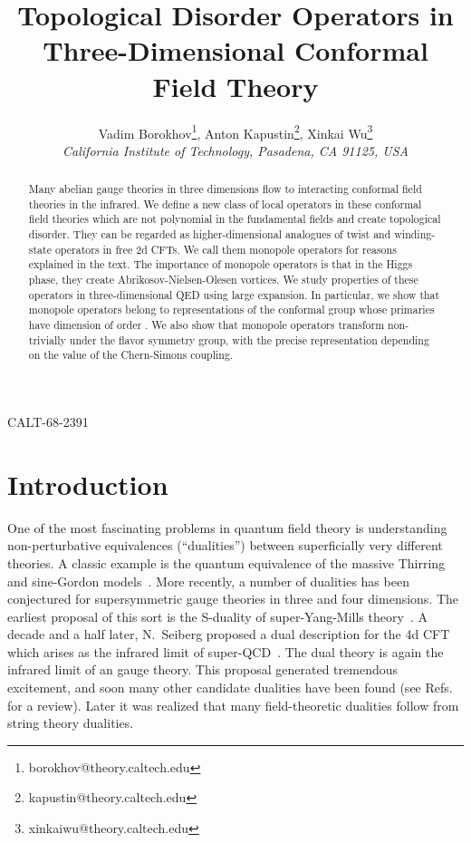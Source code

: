 \documentclass[a4paper,12pt, amsfonts, amssymb]{article}
\title{\bf \large Topological Disorder Operators in Three-Dimensional
Conformal Field Theory}
\author{Vadim Borokhov\thanks{borokhov@theory.caltech.edu}, Anton Kapustin\thanks{kapustin@theory.caltech.edu}, Xinkai Wu\thanks{xinkaiwu@theory.caltech.edu}\\
\it California Institute of Technology, Pasadena, CA 91125, USA
}
\begin{document}
\begin{titlepage}

\renewcommand{\thepage}{ }

\maketitle

\begin{abstract}

Many abelian gauge theories in three dimensions flow to interacting
conformal field theories in the infrared. We define a new class
of local operators in these conformal field theories which are not
polynomial in the fundamental fields and create
topological disorder. They can be regarded as higher-dimensional
analogues of twist and winding-state operators in free 2d CFTs. 
We call them monopole 
operators for reasons explained in the
text. The importance of monopole operators is that in the Higgs phase, 
they create Abrikosov-Nielsen-Olesen vortices. 
We study properties of these operators in three-dimensional QED using 
large \coordHE{} expansion. In particular, we show that monopole operators
belong to representations of the conformal group whose primaries have
dimension of order \coordHE{}. We also show that monopole operators transform
non-trivially under the flavor symmetry group, with the precise representation
depending on the value of the Chern-Simons coupling.

\end{abstract}

\vspace{-6.5in}

\parbox{\linewidth}
{\small\hfill CALT-68-2391}

\end{titlepage}


\section{Introduction}

One of the most fascinating problems in quantum field theory is understanding
non-perturbative equivalences (``dualities'') between superficially
very different theories. A classic example is the quantum equivalence of the massive Thirring and sine-Gordon models~\cite{Coleman,Mandelstam}.
More recently, a number of dualities has been conjectured for supersymmetric
gauge theories in three and four dimensions. The earliest proposal of
this sort is the S-duality of \coordHE{}  \coordHE{} super-Yang-Mills 
theory~\cite{MO,WO,Osborn}.
A decade and a half later, N.~Seiberg proposed a dual description for the 
4d CFT which arises as the infrared limit of \coordHE{}  \coordHE{}
super-QCD~\cite{Seiberg}. The dual theory is again the infrared limit of 
an \coordHE{}  \coordHE{} gauge theory. 
This proposal generated tremendous excitement, and soon many other candidate dualities have been found (see Refs.~\cite{Peskin,CCM} for a review). 
Later it was realized that 
many field-theoretic dualities follow from string theory dualities.
\end{document}
